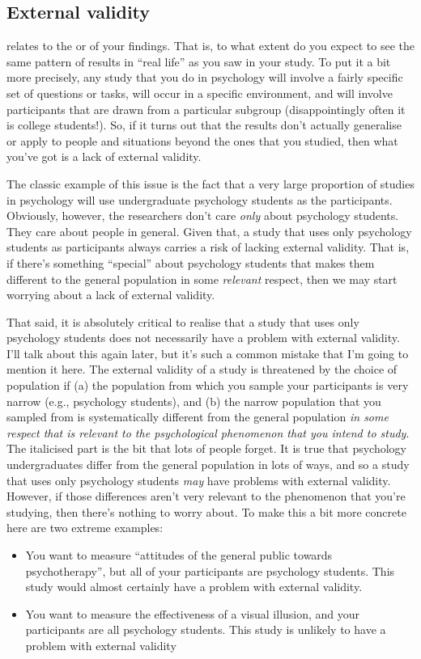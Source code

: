 \subsection{External validity}

 relates to the  or  of your findings. That is, to what extent do you expect to see the same pattern of results in ``real life'' as you saw in your study. To put it a bit more precisely, any study that you do in psychology will involve a fairly specific set of questions or tasks, will occur in a specific environment, and will involve participants that are drawn from a particular subgroup (disappointingly often it is college students!). So, if it turns out that the results don't actually generalise or apply to people and situations beyond the ones that you studied, then what you've got is a lack of external validity.

The classic example of this issue is the fact that a very large proportion of studies in psychology will use undergraduate psychology students as the participants. Obviously, however, the researchers don't care {\it only} about psychology students. They care about people in general. Given that, a study that uses only psychology students as participants always carries a risk of lacking external validity. That is, if there's something ``special'' about psychology students that makes them different to the general population in some {\it relevant} respect, then we may start worrying about a lack of external validity.

That said, it is absolutely critical to realise that a study that uses only psychology students does not necessarily have a problem with external validity. I'll talk about this again later, but it's such a common mistake that I'm going to mention it here. The external validity of a study is threatened by the choice of population if (a) the population from which you sample  your participants is very narrow (e.g., psychology students), and (b) the narrow population that you sampled from is systematically different from the general population {\it in some respect that is relevant to the psychological phenomenon that you intend to study}. The italicised part is the bit that lots of people forget. It is true that psychology undergraduates differ from the general population in lots of ways, and so a study that uses only psychology students {\it may} have problems with external validity. However, if those differences aren't very relevant to the phenomenon that you're studying, then there's nothing to worry about. To make this a bit more concrete here are two extreme examples:
\begin{itemize}
\item You want to measure ``attitudes of the general public towards psychotherapy'', but all of your participants are psychology students. This study would almost certainly have a problem with external validity.
\item You want to measure the effectiveness of a visual illusion, and your participants are all psychology students. This study is unlikely to have a problem with external validity
\end{itemize}

